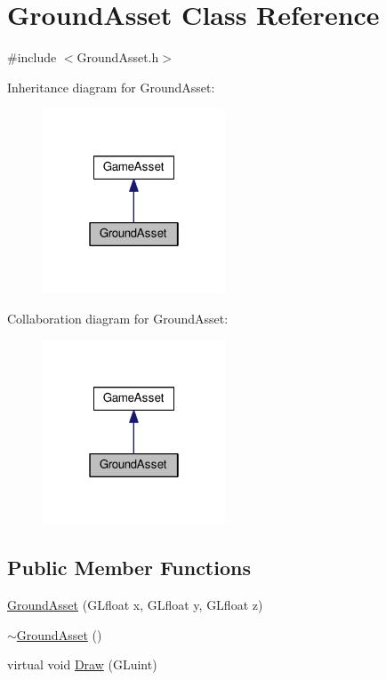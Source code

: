 \hypertarget{classGroundAsset}{}\section{Ground\+Asset Class Reference}
\label{classGroundAsset}


{\ttfamily \#include $<$Ground\+Asset.\+h$>$}



Inheritance diagram for Ground\+Asset\+:\nopagebreak
\begin{figure}[H]
\begin{center}
\leavevmode
\includegraphics[width=154pt]{classGroundAsset__inherit__graph}
\end{center}
\end{figure}


Collaboration diagram for Ground\+Asset\+:\nopagebreak
\begin{figure}[H]
\begin{center}
\leavevmode
\includegraphics[width=154pt]{classGroundAsset__coll__graph}
\end{center}
\end{figure}
\subsection*{Public Member Functions}
\begin{DoxyCompactItemize}
\item 
\hyperlink{classGroundAsset_a4b927d07732cb30f8d5b35047bc2de22}{Ground\+Asset} (G\+Lfloat x, G\+Lfloat y, G\+Lfloat z)
\item 
\hyperlink{classGroundAsset_a8f607f3cabded6280c5a5eb2cbfa8c79}{$\sim$\+Ground\+Asset} ()
\item 
virtual void \hyperlink{classGroundAsset_a440f983638c7a7ccb6a39718444dfe95}{Draw} (G\+Luint)
\end{DoxyCompactItemize}


